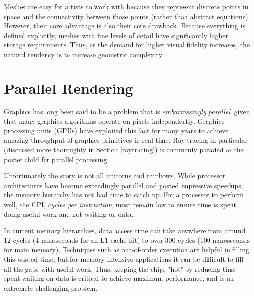 \documentclass[12pt]{ucthesis}
\begin{document}
Meshes are easy for artists to work with because they represent discrete
points in space and the connectivity between those points (rather than abstract
equations). However, their core advantage is also their core drawback. Because
everything is defined explicitly, meshes with fine levels of detail have
significantly higher storage requirements. Thus, as the demand for higher
visual fidelity increases, the natural tendency is to increase geometric
complexity.

\section{Parallel Rendering}
\label{parallel}

Graphics has long been said to be a problem that is \emph{embarrassingly parallel},
given that many graphics algorithms operate on pixels independently. Graphics
processing units (GPUs) have exploited this fact for many years to achieve
amazing throughput of graphics primitives in real-time. Ray tracing in
particular (discussed more thoroughly in Section \ref{raytracing}) is commonly
paraded as the poster child for parallel processing.

Unfortunately the story is not all unicorns and rainbows. While processor
architectures have become exceedingly parallel and posted impressive
speedups, the memory hierarchy has not had time to catch up. For a processor
to perform well, the CPI, \emph{cycles per instruction}, must remain low to
ensure time is spent doing useful work and not waiting on data.

In current memory hierarchies, data access time can take anywhere from around
12 cycles (4 nanoseconds for an L1 cache hit) to over 300 cycles (100
nanoseconds for main memory). Techniques such as out-of-order execution are
helpful in filling this wasted time, but for memory intensive applications it
can be difficult to fill all the gaps with useful work. Thus, keeping the chips
"hot" by reducing time spent waiting on data is critical to achieve maximum
performance, and is an extremely challenging problem.
\end{document}
